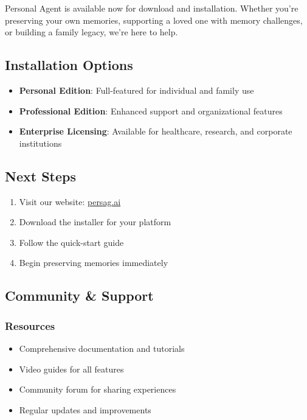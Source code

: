 \documentclass[11pt,letterpaper]{article}
\begin{document}
Personal Agent is available now for download and installation. Whether you're preserving your own memories, supporting a loved one with memory challenges, or building a family legacy, we're here to help.

\subsection{Installation Options}
\begin{itemize}[leftmargin=*]
    \item \textbf{Personal Edition}: Full-featured for individual and family use
    \item \textbf{Professional Edition}: Enhanced support and organizational features
    \item \textbf{Enterprise Licensing}: Available for healthcare, research, and corporate institutions
\end{itemize}

\subsection{Next Steps}
\begin{enumerate}
    \item Visit our website: \url{persag.ai}
    \item Download the installer for your platform
    \item Follow the quick-start guide
    \item Begin preserving memories immediately
\end{enumerate}

\subsection{Community \& Support}

\subsubsection{Resources}
\begin{itemize}[leftmargin=*]
    \item Comprehensive documentation and tutorials
    \item Video guides for all features
    \item Community forum for sharing experiences
    \item Regular updates and improvements
\end{itemize}
\end{document}
